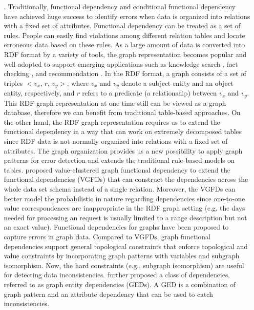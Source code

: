 . Traditionally, functional dependency \cite{kolahi2009approximating} and conditional functional dependency \cite{bohannon2007conditional} have achieved huge success to identify errors when data is organized into relations with a fixed set of attributes. Functional dependency can be treated as a set of rules. People can easily find violations among different relation tables and locate erroneous data based on these rules. As a large amount of data is converted into RDF format by a variety of tools, the graph representation becomes popular and well adopted to support emerging applications such as knowledge search \cite{jindal2014review},  fact checking \cite{fionda2018fact}, and recommendation \cite{zhang2016collaborative}. In the RDF format, a graph consists of a set of triples $<v_x$, $r$, $v_y>$, where $v_x$ and $v_y$ denote a subject entity and an object entity, respectively, and $r$ refers to a predicate (a relationship) between $v_x$ and $v_y$.
This RDF graph representation at one time still can be viewed as a graph database, therefore we can benefit from traditional table-based approaches. On the other hand, the RDF graph representation requires us to extend the functional dependency in a way that can work on extremely decomposed tables since RDF data is not normally organized into relations with a fixed set of attributes. The graph 
organization provides us a new possibility to apply graph patterns for error detection and extends the traditional rule-based models on tables. \cite{yu2011extending} proposed value-clustered graph functional dependency to extend the functional dependencies (VGFDs) that can 
construct the dependencies across the
whole data set schema instead of a single relation. Moreover, the VGFDs can better model the probabilistic in nature regarding dependencies since one-to-one value correspondences are inappropriate in the RDF graph setting (e.g. the days needed for processing an request is usually limited to a range description but not an exact value).
Functional dependencies for graphs \cite{fan2016functional} have been proposed to capture errors in graph data. 
Compared to VGFDs, graph functional dependencies support general topological constraints
that enforce topological and value constraints by incorporating graph patterns with variables and subgraph isomorphism. Now, the hard constraints (e.g., subgraph isomorphism) are useful for detecting data inconsistencies.  \cite{fan2017dependencies} further proposed a class of dependencies, referred to as graph entity dependencies (GEDs). A GED is a combination of graph pattern and an attribute dependency that can be used to catch inconsistencies.   
